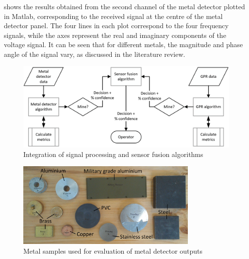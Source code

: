 \documentclass[main.tex]{subfiles}
\begin{document}
 shows the results obtained from the second channel of the metal detector plotted in Matlab, corresponding to the received signal at the centre of the metal detector panel. The four lines in each plot correspond to the four frequency signals, while the axes represent the real and imaginary components of the voltage signal. It can be seen that for different metals, the magnitude and phase angle of the signal vary, as discussed in the literature review. 

\begin{figure}[ht]
\includegraphics[width=\textwidth]{3-ConceptDesign/fusion.PNG}
\centering
\caption{Integration of signal processing and sensor fusion algorithms} 
\end{figure}

\begin{figure}[ht]
\includegraphics[width=0.8\textwidth]{3-ConceptDesign/samples.jpg}
\centering
\caption{Metal samples used for evaluation of metal detector outputs} 
\end{figure}
\end{document}
